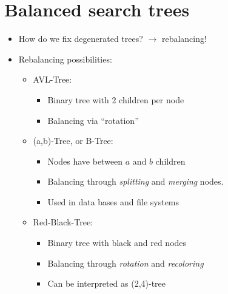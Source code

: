\documentclass[12pt, a4paper]{scrartcl}
\begin{document}
\section{Balanced search trees}
\label{sec:balanced_search_trees}
\begin{itemize}
\item How do we fix degenerated trees? $\rightarrow$ rebalancing!
\item Rebalancing possibilities:
  \begin{itemize}
  \item AVL-Tree:
    \begin{itemize}
    \item Binary tree with 2 children per node
    \item Balancing via ``rotation''
    \end{itemize}
  \item (a,b)-Tree, or B-Tree:
    \begin{itemize}
    \item Nodes have between $a$ and $b$ children
    \item Balancing through \emph{splitting} and \emph{merging} nodes.
    \item Used in data bases and file systems
    \end{itemize}
  \item Red-Black-Tree:
    \begin{itemize}
    \item Binary tree with black and red nodes
    \item Balancing through \emph{rotation} and \emph{recoloring}
    \item Can be interpreted as (2,4)-tree
    \end{itemize}
  \end{itemize}
\end{itemize}
\end{document}
